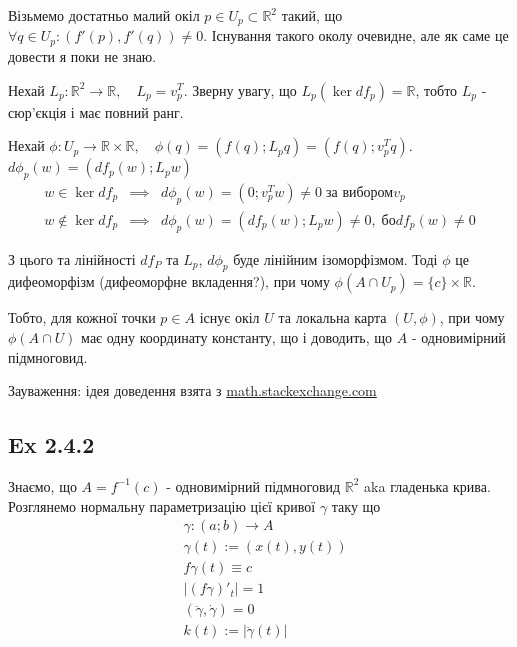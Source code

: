 \documentclass[10pt, a4paper]{article} %
\newcommand{\R}{\mathbb{R}}
\begin{document}
Візьмемо достатньо малий окіл $p \in U_p \subset \R^2$ такий, що
$\forall q \in U_p: (f'(p), f'(q)) \ne 0$. 
Існування такого околу очевидне, але як саме це довести я поки не знаю.

Нехай $L_p: \R^2 \to \R, \quad L_p = v_p^T$. 
Зверну увагу, що $L_p(\ker df_p) = \R$, тобто $L_p$ - сюр'єкція і має повний ранг.

Нехай $\phi: U_p \to \R \times \R, \quad \phi(q) = (f(q); L_p q) = (f(q); v_p^Tq)$.\\
$d\phi_p(w) = (df_p(w); L_p w)$\\

\begin{align*}
    w \in \ker df_p &\implies& d\phi_p(w) = (0; v_p^T w) \ne 0 \;\text{за вибором} v_p\\
    w \notin \ker df_p &\implies& d\phi_p(w) = (df_p(w); L_p w) \ne 0, \;\text{бо} df_p(w) \ne 0
\end{align*}

З цього та лінійності $df_P$ та $L_p$, $d\phi_p$ буде лінійним ізоморфізмом.
Тоді $\phi$ це дифеоморфізм (дифеоморфне вкладення?),
при чому $\phi(A \cap U_p) = \{c\} \times \R$.

Тобто, для кожної точки $p\in A$ існує окіл $U$ та локальна карта $(U, \phi)$, 
при чому $\phi(A\cap U)$ має одну координату константу, що і доводить, що $A$ - одновимірний підмноговид.

\begin{mdframed}
    Зауваження: ідея доведення взята з 
    \href{https://math.stackexchange.com/questions/1824631/understanding-milnors-proof-of-the-fact-that-the-preimage-of-a-regular-value-is}{math.stackexchange.com}
\end{mdframed}

\newpage
\subsection*{Ex 2.4.2}

Знаємо, що $A = f^{-1}(c)$ - одновимірний підмноговид $\R^2$ aka гладенька крива.
Розглянемо нормальну параметризацію цієї кривої $\gamma$ таку що
\begin{align*}
    & \gamma : (a;b) \to A\\
    & \gamma(t) := (x(t), y(t))\\
    & f\gamma(t) \equiv c\\
    & |(f\gamma)'_t| = 1\\
    & (\ddot\gamma, \dot\gamma) = 0\\
    & k(t) := |\ddot\gamma(t)|
\end{align*}
\end{document}
